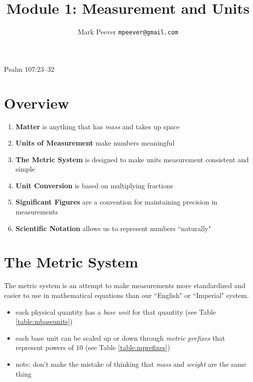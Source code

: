 \documentclass[11pt, oneside]{article}   	%
\title{Module 1: Measurement and Units}
\author{Mark Peever \texttt{mpeever@gmail.com}}
\begin{document}
\maketitle

\begin{center}
Psalm 107:23--32
\end{center}

\section{Overview}

\begin{enumerate}
\item \textbf{Matter} is anything that has \emph{mass} and takes up space
\item \textbf{Units of Measurement} make numbers meaningful
\item \textbf{The Metric System} is designed to make units measurement consistent and simple
\item \textbf{Unit Conversion} is based on multiplying fractions
\item \textbf{Significant Figures} are a convention for maintaining precision in measurements
\item \textbf{Scientific Notation} allows us to represent numbers ``naturally"   
\end{enumerate}



\section{The Metric System}
The metric system is an attempt to make measurements more standardized and easier to use in mathematical equations than our ``English" or ``Imperial" system.

\begin{itemize}
\item each physical quantity has a \emph{base unit} for that quantity \cite[p. 5]{wile-chem-2} (see Table \ref{table:mbaseunits})
\item each base unit can be scaled up or down through \emph{metric prefixes} that represent powers of $10$ \cite[p. 7]{wile-chem-2} (see Table \ref{table:mprefixes})
\item note: don't make the mistake of thinking that \emph{mass} and \emph{weight} are the same thing
\end{itemize}
\end{document}
